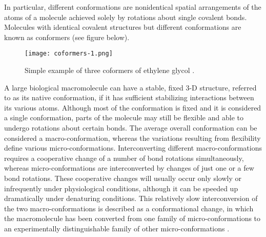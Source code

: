 \newpage

In particular, different conformations are nonidentical spatial arrangements of the atoms of a molecule achieved solely by rotations about single covalent bonds. Molecules with identical covalent structures but different conformations are known as conformers (see figure below).
\begin{figure}[h]
\centering
\begin{minipage}[t]{0.9\textwidth}
\centering
\texttt{[image: coformers-1.png]}

\caption{\small{Simple example of three coformers of ethylene glycol \cite{creighton2010biophysical}.}}

\label{fig:generation-of-microcan_state}
\end{minipage} 
\end{figure}

%
%

A large biological macromolecule can have a stable, fixed 3-D structure, referred to as its native conformation, if it has sufficient stabilizing interactions between its various atoms. Although most of the conformation is fixed and it is considered a single conformation, parts of the molecule may still be flexible and able to undergo rotations about certain bonds. The average overall conformation can be considered a macro-conformation, whereas the variations resulting from flexibility define various micro-conformations. Interconverting different macro-conformations requires a cooperative change of a number of bond rotations simultaneously, whereas micro-conformations are interconverted by changes of just one or a few bond rotations. These cooperative changes will usually occur only slowly or infrequently under physiological conditions, although it can be speeded up dramatically under denaturing conditions. This relatively slow interconversion of the two macro-conformations is described as a conformational change, in which the macromolecule has been converted from one family of micro-conformations to an experimentally distinguishable family of other micro-conformations
\cite{creighton2010biophysical}.

